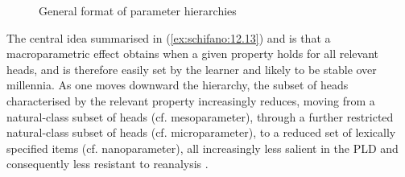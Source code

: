 \documentclass[output=paper]{langsci/langscibook}
\begin{document}
\begin{figure}
\caption{General format of parameter hierarchies\label{ex:schifano:12.14}}
\end{figure}

The central idea summarised in (\ref{ex:schifano:12.13}) and  is that a macroparametric effect
obtains when a given property holds for all relevant heads, and is therefore
easily set by the learner and likely to be stable over millennia. As one moves
downward the hierarchy, the subset of heads characterised by the relevant
property increasingly reduces, moving from a natural-class subset of heads (cf.
mesoparameter), through a further restricted natural-class subset of heads (cf.
microparameter), to a reduced set of lexically specified items (cf.
nanoparameter), all increasingly less salient in the \gls{PLD} and consequently less
resistant to reanalysis \parencite[261]{BibRob2016}.
\end{document}
